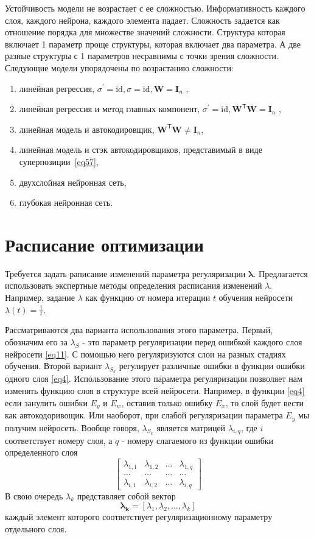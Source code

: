 \documentclass[12pt, twoside]{article}
\newenvironment{comment}{}{}
\newcommand{\w}{{\mathbf{W}}}
\begin{document}
\begin{comment}
Устойчивость модели не возрастает с ее сложностью. Информативность каждого слоя, каждого нейрона, каждого элемента падает. 
Сложность задается как отношение порядка для множестве значений сложности. Структура которая включает 1 параметр проще структуры, которая включает два параметра. А две разные структуры с 1 параметров несравнимы с точки зрения сложности.
Следующие модели упорядочены по возрастанию сложности:
\begin{enumerate}[1)]
\item линейная регрессия,  $\sigma^{'} = \text{id}, \sigma = \text{id}, \w = \mathbf{I}_n $ ,
\item линейная регрессия и метод главных компонент, $\sigma^{'} = \text{id}, \w^\mathsf{T}\w = \mathbf{I}_n $ ,
\item линейная модель и автокодировщик, $\w^\mathsf{T}\w \neq \textbf{I}_n$,
\item линейная модель и стэк автокодировщиков, представимый в виде суперпозиции~\eqref{eq57},
\item двухслойная нейронная сеть,
\item глубокая нейронная сеть.
\end{enumerate}
\section{Расписание оптимизации}
Требуется задать раписание изменений параметра регуляризации $\mathbf{\lambda}$. Предлагается использовать экспертные методы определения расписания изменений $\lambda$. Например, задание $\lambda$ как функцию от номера итерации $t$ обучения нейросети $\lambda(t)=\frac{1}{t}$.

Рассматриваются два варианта использования этого параметра. Первый, обозначим его за $\lambda_S$ - это параметр регуляризации перед ошибкой каждого слоя нейросети \eqref{eq11}. С помощью него регуляризуются слои на разных стадиях обучения. Второй вариант $\lambda_{S_k}$ регулирует различные ошибки в функции ошибки одного слоя \eqref{eq4}. Использование этого параметра регуляризации позволяет нам изменять функцию слоя в структуре всей нейросети. Например, в функции \eqref{eq4} если занулить ошибки $E_y$ и $E_w$, оставив только ошибку $E_x$, то слой будет вести как автокодоривощик. Или наоборот, при слабой регуляризации параметра $E_y$ мы получим нейросеть.
Вообще говоря, $\lambda_{S_k}$ является матрицей $\lambda_{i,q}$, где $i$ соответствует номеру слоя, а $q$ - номеру слагаемого из функции ошибки определенного слоя
\[
\begin{bmatrix}
\lambda_{1,1}& \lambda_{1,2}&\dots&\lambda_{1,q}\\
\dots& \dots&\dots&\dots \\
\lambda_{i,1}& \lambda_{i,2}&\dots&\lambda_{i,q}
\end{bmatrix}
\]
В свою очередь $\lambda_k$ представляет собой вектор
\begin{equation}\label{eq4}
\mathbf{\lambda_k} = \left[\lambda_1,\lambda_2,\dots,\lambda_k \right]
\end{equation}
каждый элемент которого соответствует регуляризационному параметру отдельного слоя.

\end{comment}
\end{document}
